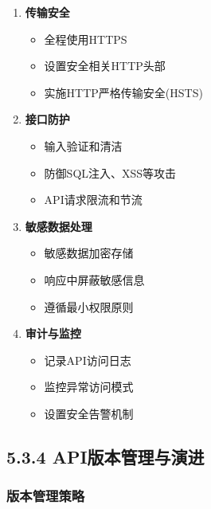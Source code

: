 \begin{enumerate}
\def\labelenumi{\arabic{enumi}.}
\tightlist
\item
  \textbf{传输安全}

  \begin{itemize}
  \tightlist
  \item
    全程使用HTTPS
  \item
    设置安全相关HTTP头部
  \item
    实施HTTP严格传输安全(HSTS)
  \end{itemize}
\item
  \textbf{接口防护}

  \begin{itemize}
  \tightlist
  \item
    输入验证和清洁
  \item
    防御SQL注入、XSS等攻击
  \item
    API请求限流和节流
  \end{itemize}
\item
  \textbf{敏感数据处理}

  \begin{itemize}
  \tightlist
  \item
    敏感数据加密存储
  \item
    响应中屏蔽敏感信息
  \item
    遵循最小权限原则
  \end{itemize}
\item
  \textbf{审计与监控}

  \begin{itemize}
  \tightlist
  \item
    记录API访问日志
  \item
    监控异常访问模式
  \item
    设置安全告警机制
  \end{itemize}
\end{enumerate}

\subsection{5.3.4
API版本管理与演进}\label{apiux7248ux672cux7ba1ux7406ux4e0eux6f14ux8fdb}

\subsubsection{版本管理策略}\label{ux7248ux672cux7ba1ux7406ux7b56ux7565}

